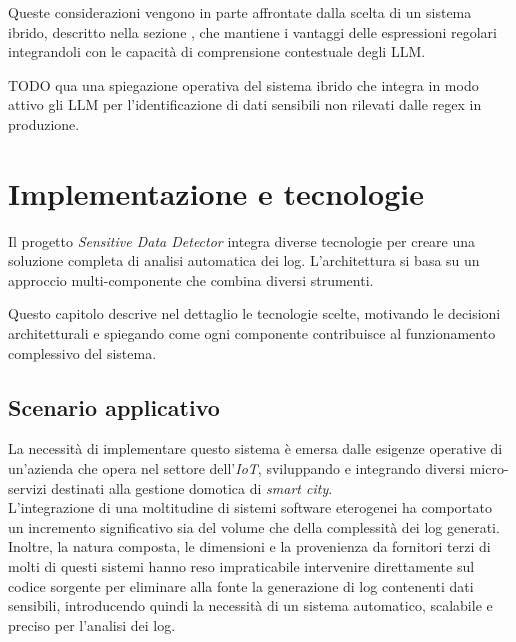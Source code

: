 \documentclass[12pt]{report}
\begin{document}
Queste considerazioni vengono in parte affrontate dalla scelta di un sistema ibrido, descritto nella sezione , che mantiene i vantaggi delle espressioni regolari integrandoli con le capacità di comprensione contestuale degli LLM.


TODO qua una spiegazione operativa del sistema ibrido che integra in modo attivo gli LLM per l'identificazione di dati sensibili non rilevati dalle regex in produzione.


%
%

\chapter{Implementazione e tecnologie}
\label{chap:implementazione_tecnologie}

Il progetto \textit{Sensitive Data Detector} integra diverse tecnologie per creare una soluzione completa di analisi automatica dei log. L'architettura si basa su un approccio multi-componente che combina diversi strumenti.

Questo capitolo descrive nel dettaglio le tecnologie scelte, motivando le decisioni architetturali e spiegando come ogni componente contribuisce al funzionamento complessivo del sistema.


\section{Scenario applicativo}
\label{sec:scenario_applicativo}
La necessità di implementare questo sistema è emersa dalle esigenze operative di un'azienda che opera nel settore dell'\textit{IoT}, sviluppando e integrando diversi micro-servizi destinati alla gestione domotica di \textit{smart city}. \\
L'integrazione di una moltitudine di sistemi software eterogenei ha comportato un incremento significativo sia del volume che della complessità dei log generati. \\
Inoltre, la natura composta, le dimensioni e la provenienza da fornitori terzi di molti di questi sistemi hanno reso impraticabile intervenire direttamente sul codice sorgente per eliminare alla fonte la generazione di log contenenti dati sensibili, introducendo quindi la necessità di un sistema automatico, scalabile e preciso per l'analisi dei log.
\end{document}

